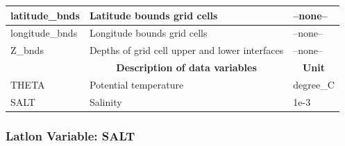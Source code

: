 \begin{longtable}{|m{}|m{}|m{}|}
latitude\_bnds &Latitude bounds grid cells &--none--  \\ \hline
longitude\_bnds &Longitude bounds grid cells &--none--  \\ \hline
Z\_bnds &Depths of grid cell upper and lower interfaces &--none--  \\ \hline
\rowcolor{lightgray} \multicolumn{1}{|c|}{\textbf{Variables}} & \multicolumn{1}{|c|}{\textbf{Description of data variables}} &  \multicolumn{1}{|c|}{\textbf{Unit}}\\ \hline
THETA &Potential temperature  &degree\_C  \\ \hline
SALT &Salinity &1e-3  \\ \hline
\end{longtable}

\newp
\pagebreak
\subsubsection{Latlon Variable: SALT}
